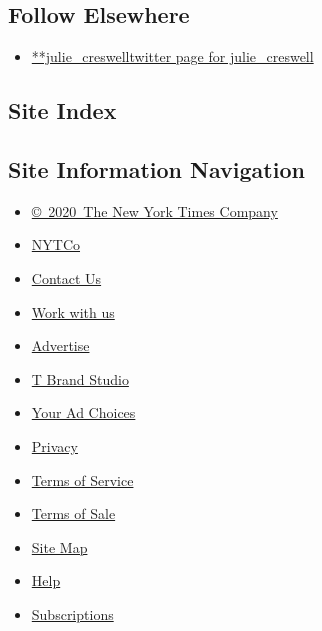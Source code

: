 \hypertarget{follow-elsewhere}{%
\subsection{Follow Elsewhere}\label{follow-elsewhere}}

\begin{itemize}
\tightlist
\item
  \href{https://twitter.com/julie_creswell}{**julie\_creswelltwitter
  page for julie\_creswell}
\end{itemize}

\hypertarget{site-index}{%
\subsection{Site Index}\label{site-index}}

\hypertarget{site-information-navigation}{%
\subsection{Site Information
Navigation}\label{site-information-navigation}}

\begin{itemize}
\tightlist
\item
  \href{https://help.nytimes3xbfgragh.onion/hc/en-us/articles/115014792127-Copyright-notice}{©~2020~The
  New York Times Company}
\end{itemize}

\begin{itemize}
\tightlist
\item
  \href{https://www.nytco.com/}{NYTCo}
\item
  \href{https://help.nytimes3xbfgragh.onion/hc/en-us/articles/115015385887-Contact-Us}{Contact
  Us}
\item
  \href{https://www.nytco.com/careers/}{Work with us}
\item
  \href{https://nytmediakit.com/}{Advertise}
\item
  \href{http://www.tbrandstudio.com/}{T Brand Studio}
\item
  \href{https://www.nytimes3xbfgragh.onion/privacy/cookie-policy\#how-do-i-manage-trackers}{Your
  Ad Choices}
\item
  \href{https://www.nytimes3xbfgragh.onion/privacy}{Privacy}
\item
  \href{https://help.nytimes3xbfgragh.onion/hc/en-us/articles/115014893428-Terms-of-service}{Terms
  of Service}
\item
  \href{https://help.nytimes3xbfgragh.onion/hc/en-us/articles/115014893968-Terms-of-sale}{Terms
  of Sale}
\item
  \href{https://spiderbites.nytimes3xbfgragh.onion}{Site Map}
\item
  \href{https://help.nytimes3xbfgragh.onion/hc/en-us}{Help}
\item
  \href{https://www.nytimes3xbfgragh.onion/subscription?campaignId=37WXW}{Subscriptions}
\end{itemize}
